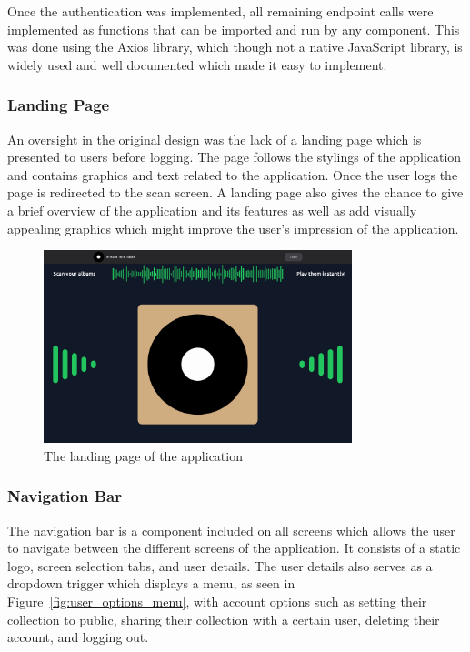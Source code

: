 Once the authentication was implemented, all remaining endpoint calls were implemented as functions that can be imported and run by any component. This was done using the Axios library, which though not a native JavaScript library, is widely used and well documented which made it easy to implement.

\subsubsection{Landing Page}
An oversight in the original design was the lack of a landing page which is presented to users before logging. The page follows the stylings of the application and contains graphics and text related to the application. Once the user logs the page is redirected to the scan screen. A landing page also gives the chance to give a brief overview of the application and its features as well as add visually appealing graphics which might improve the user's impression of the application.

\begin{figure} [H]
    \centering
    \includegraphics[width=0.8\textwidth]{figures/landing_page.png}
    \caption{The landing page of the application}
    \label{fig:landing_page}
\end{figure}

\subsubsection{Navigation Bar}
The navigation bar is a component included on all screens which allows the user to navigate between the different screens of the application. It consists of a static logo, screen selection tabs, and user details. The user details also serves as a dropdown trigger which displays a menu, as seen in Figure~\ref{fig:user_options_menu}, with account options such as setting their collection to public, sharing their collection with a certain user, deleting their account, and logging out.

